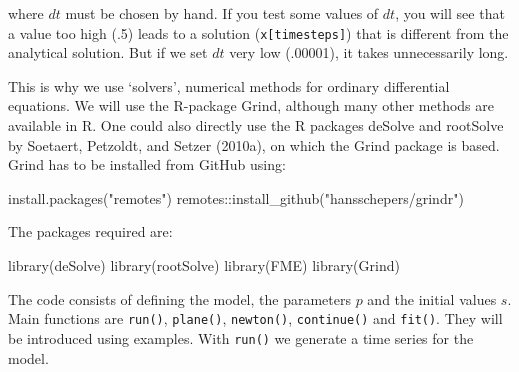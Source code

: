\documentclass[
  a4paper,
  DIV=11,
  numbers=noendperiod]{scrreprt}
\newenvironment{Shaded}{\begin{snugshade}}{\end{snugshade}}
\newcommand{\FunctionTok}[1]{\textcolor[rgb]{0.28,0.35,0.67}{#1}}
\newcommand{\NormalTok}[1]{\textcolor[rgb]{0.00,0.23,0.31}{#1}}
\newcommand{\SpecialCharTok}[1]{\textcolor[rgb]{0.37,0.37,0.37}{#1}}
\newcommand{\StringTok}[1]{\textcolor[rgb]{0.13,0.47,0.30}{#1}}
\begin{document}
where \(dt\) must be chosen by hand. If you test some values of \(dt\),
you will see that a value too high (.5) leads to a solution
(\texttt{x{[}timesteps{]}}) that is different from the analytical
solution. But if we set \(dt\) very low (.00001), it takes unnecessarily
long.

This is why we use `solvers', numerical methods for ordinary
differential equations. We will use the R-package Grind, although many
other methods are available in R. One could also directly use the R
packages deSolve and rootSolve by Soetaert, Petzoldt, and Setzer
(2010a), on which the Grind package is based. Grind has to be installed
from GitHub using:

\begin{Shaded}
\begin{Highlighting}[]
\FunctionTok{install.packages}\NormalTok{(}\StringTok{"remotes"}\NormalTok{)}
\NormalTok{remotes}\SpecialCharTok{::}\FunctionTok{install\_github}\NormalTok{(}\StringTok{"hansschepers/grindr"}\NormalTok{)}
\end{Highlighting}
\end{Shaded}

The packages required are:

\begin{Shaded}
\begin{Highlighting}[]
\FunctionTok{library}\NormalTok{(deSolve)}
\FunctionTok{library}\NormalTok{(rootSolve)}
\FunctionTok{library}\NormalTok{(FME)}
\FunctionTok{library}\NormalTok{(Grind)}
\end{Highlighting}
\end{Shaded}

The code consists of defining the model, the parameters \(p\) and the
initial values \(s\). Main functions are \texttt{run()},
\texttt{plane()}, \texttt{newton()}, \texttt{continue()} and
\texttt{fit()}. They will be introduced using examples. With
\texttt{run()} we generate a time series for the model.
\end{document}
